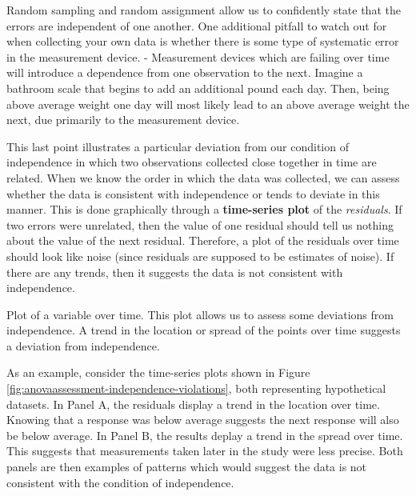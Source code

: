 \documentclass[]{book}
\theoremstyle{definition}
\theoremstyle{definition}
\theoremstyle{definition}
\theoremstyle{remark}
\let\BeginKnitrBlock\begin \let\EndKnitrBlock\end
\begin{document}
Random sampling and random assignment allow us to confidently state that
the errors are independent of one another. One additional pitfall to
watch out for when collecting your own data is whether there is some
type of systematic error in the measurement device. - Measurement
devices which are failing over time will introduce a dependence from one
observation to the next. Imagine a bathroom scale that begins to add an
additional pound each day. Then, being above average weight one day will
most likely lead to an above average weight the next, due primarily to
the measurement device.

This last point illustrates a particular deviation from our condition of
independence in which two observations collected close together in time
are related. When we know the order in which the data was collected, we
can assess whether the data is consistent with independence or tends to
deviate in this manner. This is done graphically through a
\textbf{time-series plot} of the \emph{residuals}. If two errors were
unrelated, then the value of one residual should tell us nothing about
the value of the next residual. Therefore, a plot of the residuals over
time should look like noise (since residuals are supposed to be
estimates of noise). If there are any trends, then it suggests the data
is not consistent with independence.

\BeginKnitrBlock{definition}[Time Series Plot]
\protect\hypertarget{def:defn-time-series-plot}{}{\label{def:defn-time-series-plot}
{} }Plot of a variable over time. This
plot allows us to assess some deviations from independence. A trend in
the location or spread of the points over time suggests a deviation from
independence.
\EndKnitrBlock{definition}

As an example, consider the time-series plots shown in Figure
\ref{fig:anovaassessment-independence-violations}, both representing
hypothetical datasets. In Panel A, the residuals display a trend in the
location over time. Knowing that a response was below average suggests
the next response will also be below average. In Panel B, the results
deplay a trend in the spread over time. This suggests that measurements
taken later in the study were less precise. Both panels are then
examples of patterns which would suggest the data is not consistent with
the condition of independence.
\end{document}
